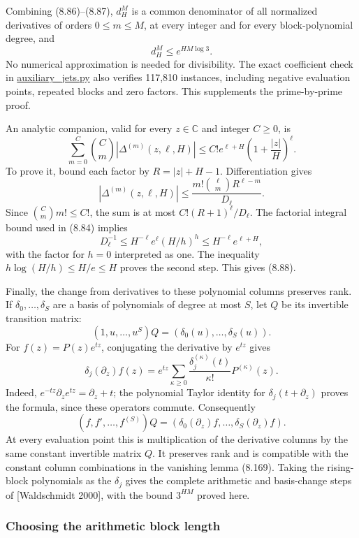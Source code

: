 \documentclass[
  11pt,
  a4paper,
]{article}
\begin{document}
Combining (8.86)--(8.87), \(d_H^M\) is a common denominator of all
normalized derivatives of orders \(0\le m\le M\), at every integer and
for every block-polynomial degree, and \[
d_H^M\le e^{HM\log3}.
\] No numerical approximation is needed for divisibility. The exact
coefficient check in
\href{https://kokunoyumeto.github.io/open-math-courses-public/courses/TR-BAKER/verification/auxiliary_jets.py}{auxiliary\_jets.py} also
verifies 117,810 instances, including negative evaluation points,
repeated blocks and zero factors. This supplements the prime-by-prime
proof.

An analytic companion, valid for every \(z\in\mathbb C\) and integer
\(C\ge0\), is \[
\sum_{m=0}^C\binom Cm|\Delta^{(m)}(z,\ell,H)|
\le C!e^{\ell+H}\left(1+\frac{|z|}{H}\right)^\ell.
\tag{8.88}
\] To prove it, bound each factor by \(R=|z|+H-1\). Differentiation
gives \[
|\Delta^{(m)}(z,\ell,H)|
\le\frac{m!\binom\ell m R^{\ell-m}}{D_\ell}.
\] Since \(\binom Cm m!\le C!\), the sum is at most
\(C!(R+1)^\ell/D_\ell\). The factorial integral bound used in (8.84)
implies \[
D_\ell^{-1}\le H^{-\ell}e^\ell(H/h)^h
\le H^{-\ell}e^{\ell+H},
\] with the factor for \(h=0\) interpreted as one. The inequality
\(h\log(H/h)\le H/e\le H\) proves the second step. This gives (8.88).

Finally, the change from derivatives to these polynomial columns
preserves rank. If \(\delta_0,\ldots,\delta_S\) are a basis of
polynomials of degree at most \(S\), let \(Q\) be its invertible
transition matrix: \[
(1,u,\ldots,u^S)Q=(\delta_0(u),\ldots,\delta_S(u)).
\] For \(f(z)=P(z)e^{tz}\), conjugating the derivative by \(e^{tz}\)
gives \[
\delta_j(\partial_z)f(z)
=e^{tz}\sum_{\kappa\ge0}
\frac{\delta_j^{(\kappa)}(t)}{\kappa!}P^{(\kappa)}(z).
\tag{8.89}
\] Indeed, \(e^{-tz}\partial_z e^{tz}=\partial_z+t\); the polynomial
Taylor identity for \(\delta_j(t+\partial_z)\) proves the formula, since
these operators commute. Consequently \[
(f,f',\ldots,f^{(S)})Q
=(\delta_0(\partial_z)f,\ldots,\delta_S(\partial_z)f).
\] At every evaluation point this is multiplication of the derivative
columns by the same constant invertible matrix \(Q\). It preserves rank
and is compatible with the constant column combinations in the vanishing
lemma (8.169). Taking the rising-block polynomials as the \(\delta_j\)
gives the complete arithmetic and basis-change steps of {[}Waldschmidt
2000{]}, with the bound \(3^{HM}\) proved here.

\subsubsection{Choosing the arithmetic block
length}\label{choosing-the-arithmetic-block-length}
\end{document}
